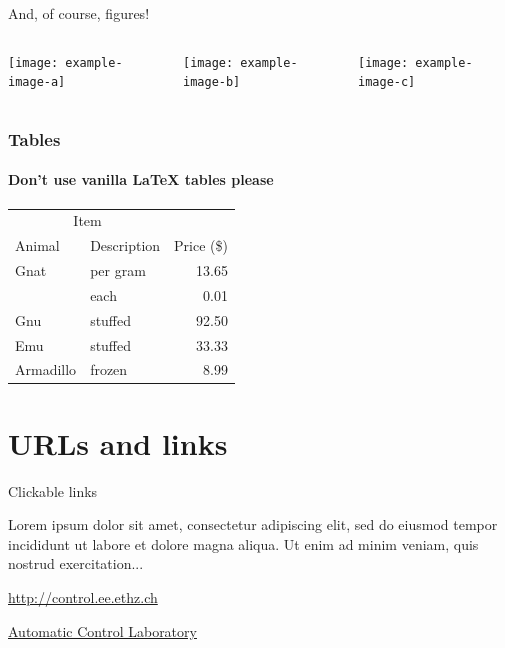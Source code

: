 \documentclass[11pt,aspectratio=169]{beamer}
\begin{document}
\begin{frame}{And, of course, figures!}

	\begin{columns}
		\begin{column}{0.33\textwidth}
			\texttt{[image: example-image-a]}
		\end{column}
		\begin{column}{0.33\textwidth}
			\texttt{[image: example-image-b]}
		\end{column}
		\begin{column}{0.33\textwidth}
			\texttt{[image: example-image-c]}
		\end{column}
	\end{columns}

\end{frame}

\begin{frame}

	\frametitle{Tables}
	\framesubtitle{Don't use vanilla \LaTeX{}  tables please}
	
		\begin{center}
			\begin{tabular}{@{}llr@{}}
				\toprule\multicolumn{2}{c}{Item} \\
				\cmidrule(r){1-2}Animal & Description & Price (\$)\\
				\midrule
				Gnat  & per gram  & 13.65 \\
				& each      & 0.01 \\
				Gnu   & stuffed   & 92.50 \\
				Emu   & stuffed   & 33.33 \\
				Armadillo & frozen & 8.99 \\
				\bottomrule
			\end{tabular}
		\end{center}

\end{frame}

\section{URLs and links}

\begin{frame}{Clickable links}

	Lorem ipsum dolor sit amet, consectetur adipiscing elit, sed do eiusmod tempor incididunt ut labore et dolore magna aliqua. 
	Ut enim ad minim veniam, quis nostrud exercitation...
	
	\medskip

	\url{http://control.ee.ethz.ch}
	
	\href{http://control.ee.ethz.ch}{Automatic Control Laboratory}
	

\end{frame}
\end{document}
